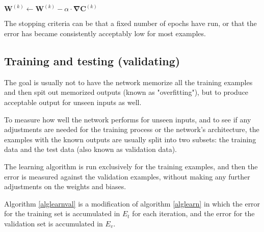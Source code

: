\documentclass{article}
\begin{document}
      \begin{algorithm}
        \caption{%
          Algorithm \ref{algadjustweights} with matrix-vector notation.
        } \label{algadjustweightsvec}
        \begin{algorithmic}
              \State $
                \mathbf{W}^{(k)} \gets
                  \mathbf{W}^{(k)} - \alpha \cdot \mathbf{\nabla C}^{(k)}
              $
            \EndFor
          \EndProcedure
        \end{algorithmic}
      \end{algorithm}

      The stopping criteria can be that a fixed number of epochs have run, or
      that the error has became consistently acceptably low for most examples.

    \subsection{Training and testing (validating)}

      The goal is usually not to have the network memorize all the training
      examples and then spit out memorized outputs (known as "overfitting"),
      but to produce acceptable output for unseen inputs as well.

      To measure how well the network performs for unseen inputs, and to see if
      any adjustments are needed for the training process or the network's
      architecture, the examples with the known outputs are usually split into
      two subsets: the training data and the test data (also known as
      validation data).

      The learning algorithm is run exclusively for the training examples, and
      then the error is measured against the validation examples, without
      making any further adjustments on the weights and biases.

      Algorithm \ref{alglearnval} is a modification of algorithm \ref{alglearn}
      in which the error for the training set is accumulated in $E_t$ for each
      iteration, and the error for the validation set is accumulated in $E_v$.
\end{document}
